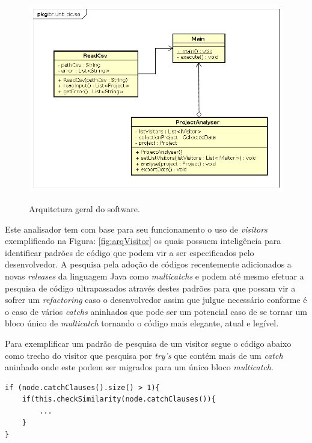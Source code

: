 \begin{figure}[h]
	\center
	\includegraphics[scale=0.45]{Imagens/Arquitetura}
	\label{fig:arqGeral}
	\caption{Arquitetura geral do software.}
\end{figure}


Este analisador tem com base para seu funcionamento o uso de {\it visitors} \cite{Gamma:1995:DPE:186897} exemplificado na Figura: \ref{fig:arqVisitor} os quais possuem inteligência para identificar padrões de código que podem vir a ser especificados pelo desenvolvedor. A pesquisa pela adoção de códigos recentemente adicionados a novas {\it releases} da linguagem Java como {\it multicatchs} e podem até mesmo efetuar a pesquisa de código ultrapassados através destes padrões para que possam vir a sofrer um \textit{refactoring} caso o desenvolvedor assim que julgue necessário conforme é o caso de vários {\it catchs} aninhados que pode ser um potencial caso de se tornar um bloco único de {\it multicatch} tornando o código mais elegante, atual e legível.

Para exemplificar um padrão de pesquisa de um visitor segue o código abaixo como trecho do visitor que pesquisa por \textit{try's} que contém mais de um \textit{catch} aninhado onde este podem ser migrados para um único bloco \textit{multicatch}. 
\begin{lstlisting}
if (node.catchClauses().size() > 1){
	if(this.checkSimilarity(node.catchClauses()){
		...
	}
}
\end{lstlisting}


